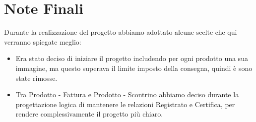\section{Note Finali}
Durante la realizzazione del progetto abbiamo adottato alcune scelte che qui verranno spiegate meglio:
\begin{itemize}
\item Era stato deciso di iniziare il progetto includendo per ogni prodotto una sua immagine, ma questo superava il limite imposto della consegna, quindi \`e sono state rimosse.

\item Tra Prodotto - Fattura e Prodotto - Scontrino abbiamo deciso durante la progettazione logica di mantenere le relazioni Registrato e Certifica, per rendere complessivamente il progetto pi\`u chiaro.

\end{itemize}
